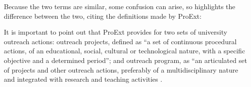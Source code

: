 

Because the two terms are similar, some confusion can arise, so \textcite{Viero} highlights the difference between the two, citing the definitions made by \ac{ProExt}:


\begin{citacao}
It is important to point out that ProExt provides for two sets of university outreach actions: outreach projects, defined as “a set of continuous procedural actions, of an educational, social, cultural or technological nature, with a specific objective and a determined period”; and outreach program, as “an articulated set of projects and other outreach actions, preferably of a multidisciplinary nature and integrated with research and teaching activities \cite{Viero}.
\end{citacao}

